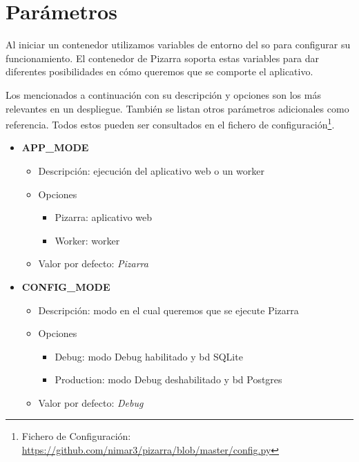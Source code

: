\documentclass[11pt,spanish,listoffigures,listoftables]{tfgetsinf}
\begin{document}
\section{Parámetros}

Al iniciar un \Gls{contenedor} utilizamos variables de entorno del \acrshort{so} para configurar su funcionamiento. El \Gls{contenedor} de Pizarra soporta estas variables para dar diferentes posibilidades en cómo queremos que se comporte el aplicativo. 

Los mencionados a continuación con su descripción y opciones son los más relevantes en un despliegue. También se listan otros parámetros adicionales como referencia. Todos estos pueden ser consultados en el fichero de configuración\footnote{Fichero de Configuración: \url{https://github.com/nimar3/pizarra/blob/master/config.py}}.

\begin{itemize}
	\item \textbf{APP\_MODE}
	\begin{itemize}
		\item Descripción: ejecución del aplicativo web o un worker
		\item Opciones
		\begin{itemize}
			\item Pizarra: aplicativo web
			\item Worker: worker
		\end{itemize}
		\item Valor por defecto: \textit{Pizarra}
	\end{itemize}
\end{itemize}

\begin{itemize}
	\item \textbf{CONFIG\_MODE}
	\begin{itemize}
		\item Descripción: modo en el cual queremos que se ejecute Pizarra
		\item Opciones
		\begin{itemize}
			\item Debug: modo Debug habilitado y \acrfull{bd} SQLite
			\item Production: modo Debug deshabilitado y \acrfull{bd} Postgres
		\end{itemize}
		\item Valor por defecto: \textit{Debug}
	\end{itemize}
\end{itemize}
\end{document}
